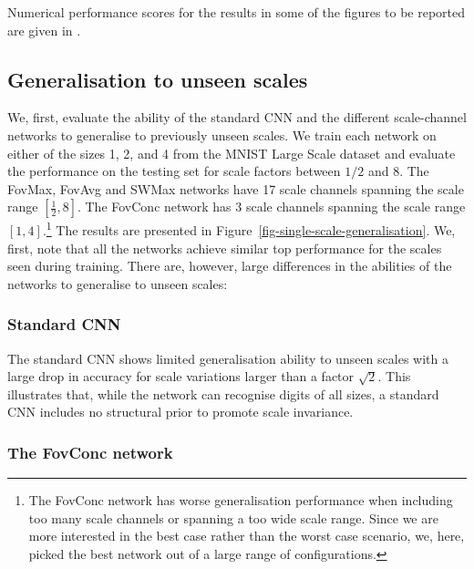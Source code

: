 \documentclass[twocolumn,runningheads]{svjour3}
\begin{document}
Numerical performance scores for the results in
some of the figures 
to be reported are given in \cite{JanLin20-arXiv}.

\subsection{Generalisation to unseen scales}

We, first, evaluate the ability of the standard CNN and the different
scale-channel networks to generalise to previously unseen scales. We
train each network on either of the sizes 1, 2, and 4 
from the MNIST Large Scale dataset and evaluate the performance 
on the testing set for scale factors between $1/2$ and $8$. 
The FovMax, FovAvg and SWMax networks have 17 scale channels spanning
the scale range $[\frac{1}{2}, 8]$. The FovConc network has 3 scale
channels spanning the scale range $[1, 4]$.\footnote{The FovConc network has worse generalisation performance when
  including too many scale channels or spanning a too wide scale
  range. Since we are more interested in the best case rather than the
  worst case scenario, we, here, picked the best network out of a
  large range of configurations.} 
The results are presented in Figure~\ref{fig-single-scale-generalisation}. 
We, first, note that all the networks achieve similar top performance for
the scales seen during training. There are, however, large differences
in the abilities of the networks to generalise to unseen scales: 

\subsubsection{Standard CNN}

The standard CNN shows limited generalisation ability to unseen scales
with a large drop in accuracy for scale variations larger than a
factor $\sqrt{2}$. This illustrates that, while the network can
recognise digits of all sizes, a standard CNN includes no structural
prior to promote scale invariance. 

\subsubsection{The FovConc network}
\end{document}
